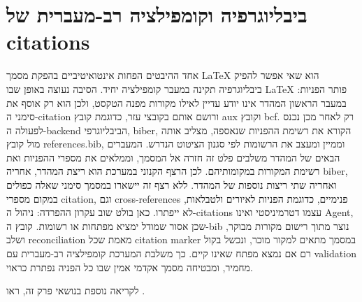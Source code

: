 \section{ביבליוגרפיה וקומפילציה רב-מעברית של citations}
אחד ההיבטים הפחות אינטואיטיביים בהפקת מסמך LaTeX הוא שאי אפשר להפיק ביבליוגרפיה תקינה במעבר קומפילציה יחיד. הסיבה נעוצה באופן שבו LaTeX פותר הפניות: במעבר הראשון המהדר אינו יודע עדיין לאילו מקורות מפנה הטקסט, ולכן הוא רק אוסף את סימני ה-citation ורושם אותם בקובצי עזר, כדוגמת קובץ aux וקובץ bcf. רק לאחר מכן נכנס לפעולה ה-backend הביבליוגרפי, biber, הקורא את רשימת ההפניות שנאספה, מצליב אותה מול קובץ references.bib, וממיין ומעצב את הרשומות לפי סגנון הציטוט הנדרש. המעברים הבאים של המהדר משלבים פלט זה חזרה אל המסמך, וממלאים את מספרי ההפניות ואת רשימת המקורות במקומותיהם. לכן הרצף הקנוני במערכת הוא ריצת המהדר, אחריה biber, ואחריה שתי ריצות נוספות של המהדר. ללא רצף זה יישארו במסמך סימני שאלה כפולים במקום מספרי citation, וגם cross-references פנימיים, כדוגמת הפניות לאיורים ולטבלאות, לא ייפתרו. כאן בולט שוב עקרון ההפרדה: ניהול ה-citations עצמו דטרמיניסטי ואינו Agent, שכן אסור שמודל ימציא מפתחות או רשומות. קובץ ה-bib נוצר מתוך רישום מקורות מבוקר, ושלב reconciliation מאמת שכל citation marker במסמך מתאים למקור מוכר, ונכשל בקול רם אם נמצא מפתח שאינו קיים. כך משלבת המערכת קומפילציה רב-מעברית עם validation מחמיר, ומבטיחה מסמך אקדמי אמין שבו כל הפניה נפתרת כראוי.

לקריאה נוספת בנושאי פרק זה, ראו \cite{langchain_docs}.

